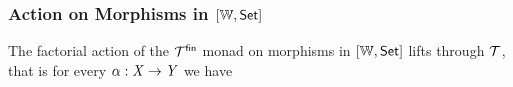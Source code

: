 \subsubsection[Action on Morphisms in {[W,Set]}]{Action on Morphisms in $[\mathbb{W}, \mathsf{Set}]$}
\begin{theorem}
The factorial action of the $\mathcal{T}^{\mathsf{fin}}$ monad on morphisms in $[\mathbb{W}, \mathsf{Set}]$ lifts through $\mathcal{T}$, 
that is for every $\alpha : \mathit{X} \to \mathit{Y}$ we have
\begin{center}
\end{center}
\end{theorem}
